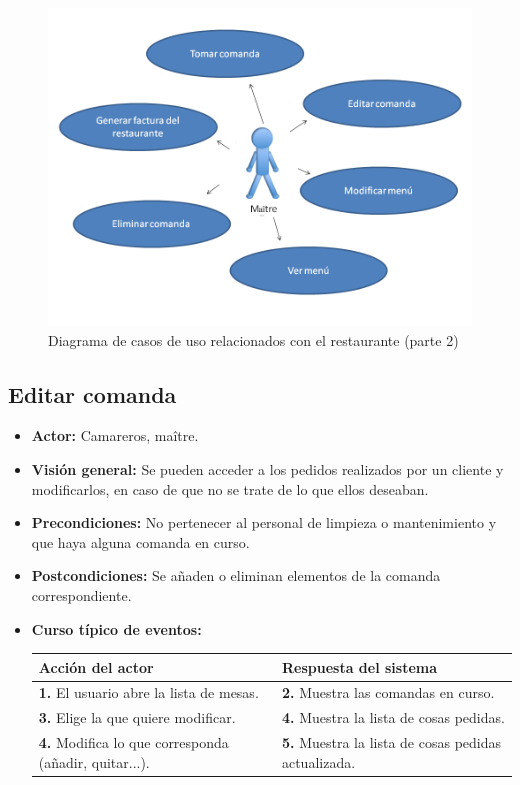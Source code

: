 \documentclass[spanish,a4paper,11pt, twoside]{report}	%
\begin{document}
	\begin{figure}[!h]
		\centering
		\includegraphics[scale=0.5]{Restaurante2.png}
		\caption{Diagrama de casos de uso relacionados con el restaurante (parte 2)}
	\end{figure}

		
	\subsection{Editar comanda}
			\begin{itemize}
			\item \textbf{Actor:} Camareros, maître.
			\item \textbf{Visión general:} Se pueden acceder a los pedidos realizados por un
				cliente y modificarlos, en caso de que no se trate de lo que ellos deseaban.
			\item \textbf{Precondiciones:} No pertenecer al personal de limpieza o
				mantenimiento y que haya alguna comanda en curso.
			\item \textbf{Postcondiciones:} Se añaden o eliminan elementos de la comanda
				correspondiente.
			\item \textbf{Curso típico de eventos:}  \\
				\begin{tabular}{|p{6cm}||p{6cm}|}
				\hline
				\textbf{Acción del actor} & \textbf{Respuesta del sistema} \\ \hline \hline
				\textbf{1.} El usuario abre la lista de mesas. & 
				\textbf{2.} Muestra las comandas en curso.\\ \hline 
				\textbf{3.} Elige la que quiere modificar. & 
				\textbf{4.} Muestra la lista de cosas pedidas. \\ \hline
				\textbf{4.} Modifica lo que corresponda (añadir, quitar...). & 
				\textbf{5.} Muestra la lista de cosas pedidas actualizada. \\ \hline
			\end{tabular}
		\end {itemize}
\end{document}
